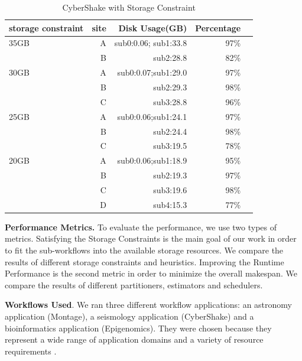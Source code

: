 \begin{table}[h!]
\caption{CyberShake with Storage Constraint}
\label{tab:constraint}
\centering
\begin{tabular}{lrrrr}
\hline
 storage constraint    &    site &    Disk Usage(GB) &   Percentage  \\
\hline
35GB & A & sub0:0.06; sub1:33.8 & 97\%&\\
& B & sub2:28.8&82\% &\\
30GB & A & sub0:0.07;sub1:29.0 & 97\% \\
& B & sub2:29.3&98\% &\\
& C & sub3:28.8&96\% &\\
25GB & A & sub0:0.06;sub1:24.1 & 97\%& \\

 & B & sub2:24.4 & 98\%& \\
&C&sub3:19.5&78\%&\\
20GB&A&sub0:0.06;sub1:18.9&95\%&\\
&B&sub2:19.3&97\%&\\
&C&sub3:19.6&98\%&\\
&D&sub4:15.3&77\%&\\
\hline
\end{tabular}
\end{table} 


\textbf{Performance Metrics.} To evaluate the performance, we use two types of metrics. Satisfying the Storage Constraints is the main goal of our work in order to fit the sub-workflows into the available storage resources. We compare the results of different storage constraints and heuristics. Improving the Runtime Performance is the second metric in order to minimize the overall makespan. We compare the results of different partitioners, estimators and schedulers. 

\textbf{Workflows Used}. We ran three different workflow applications: an astronomy application (Montage), a seismology application (CyberShake) and a bioinformatics application (Epigenomics). They were chosen because they represent a wide range of application domains and a variety of resource requirements \cite{Juve2009}. 



